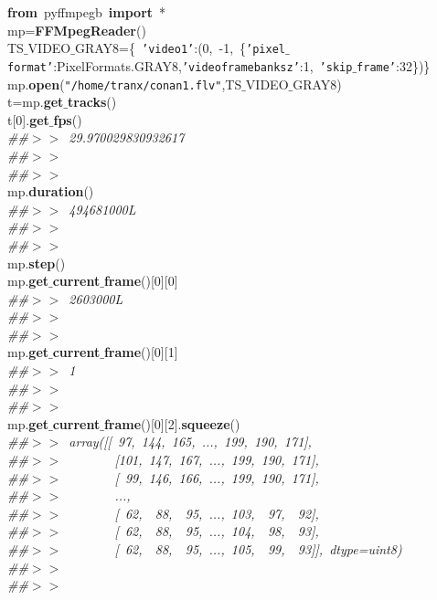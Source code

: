 \noindent
\mbox{}\textbf{from}\ pyffmpegb\ \textbf{import}\ * \\
\mbox{}mp=\textbf{FFMpegReader}() \\
\mbox{}TS$\_$VIDEO$\_$GRAY8=\{\ \texttt{'video1'}:(0,\ -1,\ \{\texttt{'pixel$\_$format'}:PixelFormats.GRAY8,\texttt{'videoframebanksz'}:1,\ \texttt{'skip$\_$frame'}:32\})\} \\
\mbox{}mp.\textbf{open}(\texttt{"{}/home/tranx/conan1.flv"{}},TS$\_$VIDEO$\_$GRAY8) \\
\mbox{}t=mp.\textbf{get$\_$tracks}() \\
\mbox{}t[0].\textbf{get$\_$fps}() \\
\mbox{}\textit{\#\#$>$$>$\ 29.970029830932617} \\
\mbox{}\textit{\#\#$>$$>$\ } \\
\mbox{}\textit{\#\#$>$$>$\ } \\
\mbox{}mp.\textbf{duration}() \\
\mbox{}\textit{\#\#$>$$>$\ 494681000L} \\
\mbox{}\textit{\#\#$>$$>$\ } \\
\mbox{}\textit{\#\#$>$$>$\ } \\
\mbox{}mp.\textbf{step}() \\
\mbox{}mp.\textbf{get$\_$current$\_$frame}()[0][0] \\
\mbox{}\textit{\#\#$>$$>$\ 2603000L} \\
\mbox{}\textit{\#\#$>$$>$\ } \\
\mbox{}\textit{\#\#$>$$>$\ } \\
\mbox{}mp.\textbf{get$\_$current$\_$frame}()[0][1] \\
\mbox{}\textit{\#\#$>$$>$\ 1} \\
\mbox{}\textit{\#\#$>$$>$\ } \\
\mbox{}\textit{\#\#$>$$>$\ } \\
\mbox{}mp.\textbf{get$\_$current$\_$frame}()[0][2].\textbf{squeeze}() \\
\mbox{}\textit{\#\#$>$$>$\ array([[\ 97,\ 144,\ 165,\ ...,\ 199,\ 190,\ 171],} \\
\mbox{}\textit{\#\#$>$$>$\ \ \ \ \ \ \ \ [101,\ 147,\ 167,\ ...,\ 199,\ 190,\ 171],} \\
\mbox{}\textit{\#\#$>$$>$\ \ \ \ \ \ \ \ [\ 99,\ 146,\ 166,\ ...,\ 199,\ 190,\ 171],} \\
\mbox{}\textit{\#\#$>$$>$\ \ \ \ \ \ \ \ ...,\ } \\
\mbox{}\textit{\#\#$>$$>$\ \ \ \ \ \ \ \ [\ 62,\ \ 88,\ \ 95,\ ...,\ 103,\ \ 97,\ \ 92],} \\
\mbox{}\textit{\#\#$>$$>$\ \ \ \ \ \ \ \ [\ 62,\ \ 88,\ \ 95,\ ...,\ 104,\ \ 98,\ \ 93],} \\
\mbox{}\textit{\#\#$>$$>$\ \ \ \ \ \ \ \ [\ 62,\ \ 88,\ \ 95,\ ...,\ 105,\ \ 99,\ \ 93]],\ dtype=uint8)} \\
\mbox{}\textit{\#\#$>$$>$\ } \\
\mbox{}\textit{\#\#$>$$>$\ } \\
\mbox{} \\
\mbox{}